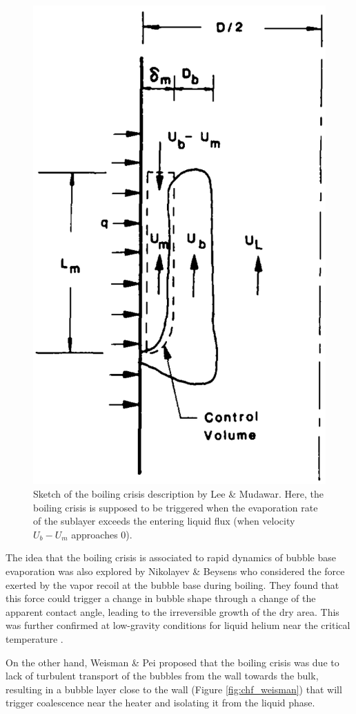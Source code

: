 \begin{figure}[!h]
\centering
\includegraphics[width=0.4\linewidth]{img/chf/chf_lee.png}
\caption{Sketch of the boiling crisis description by Lee \& Mudawar. Here, the boiling crisis is supposed to be triggered when the evaporation rate of the sublayer exceeds the entering liquid flux (\ie when velocity $U_{b}-U_{m}$ approaches 0).}
\label{fig:chf_lee}
\end{figure}

\npar

The idea that the boiling crisis is associated to rapid dynamics of bubble base evaporation was also explored by Nikolayev \& Beysens \cite{nikolayev_boiling_1999} who considered the force exerted by the vapor recoil at the bubble base during boiling. They found that this force could trigger a change in bubble shape through a change of the apparent contact angle, leading to the irreversible growth of the dry area. This was further confirmed at low-gravity conditions for liquid helium near the critical temperature \cite{nikolayev_experimental_2006, nikolayev_boiling_2015}.


\npar

On the other hand, Weisman \& Pei \cite{weisman_prediction_1983} proposed that the boiling crisis was due to lack of turbulent transport of the bubbles from the wall towards the bulk, resulting in a bubble layer close to the wall (Figure \ref{fig:chf_weisman}) that will trigger coalescence near the heater and isolating it from the liquid phase. 



